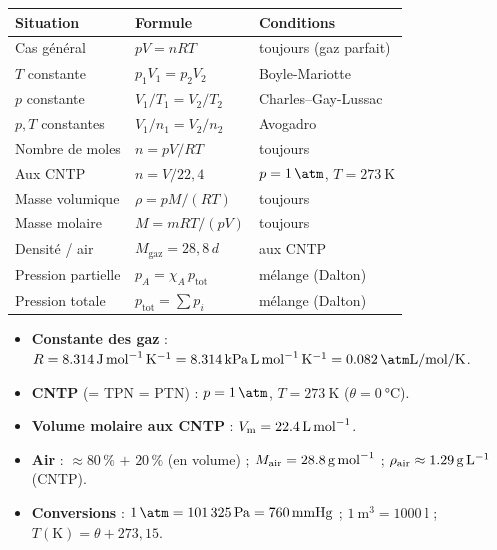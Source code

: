 \documentclass[11pt,a4paper]{article}
\newcommand{\Vm}{V_{\mathrm{m}}}
\begin{document}
\begin{tcolorbox}[boxbase,colback=formulacol!6,colframe=formulacol,
   title={\textsc{Mémo — les formules à connaître}}]
\begin{center}\renewcommand{\arraystretch}{1.5}
\begin{tabular}{l l l}
\toprule
\textbf{Situation} & \textbf{Formule} & \textbf{Conditions}\\
\midrule
Cas général                 & $pV=nRT$                       & toujours (gaz parfait)\\
$T$ constante               & $p_1V_1=p_2V_2$                & Boyle-Mariotte\\
$p$ constante               & $V_1/T_1=V_2/T_2$              & Charles--Gay-Lussac\\
$p,T$ constantes            & $V_1/n_1=V_2/n_2$             & Avogadro\\
Nombre de moles             & $n=pV/RT$                      & toujours\\
Aux CNTP                    & $n=V/22{,}4$                  & $p=\qty{1}{\atm}$, $T=\qty{273}{\kelvin}$\\
Masse volumique             & $\rho=pM/(RT)$                & toujours\\
Masse molaire               & $M=mRT/(pV)$                 & toujours\\
Densité / air               & $M_{\text{gaz}}=28{,}8\,d$    & aux CNTP\\
Pression partielle          & $p_A=\chi_A\,p_{\text{tot}}$  & mélange (Dalton)\\
Pression totale             & $p_{\text{tot}}=\sum p_i$     & mélange (Dalton)\\
\bottomrule
\end{tabular}
\end{center}
\end{tcolorbox}

\begin{tcolorbox}[boxbase,colback=primary!6,colframe=primary,
   title={\textsc{Mémo — valeurs et constantes de référence}}]
\begin{itemize}[leftmargin=1.6em,topsep=2pt,itemsep=2pt]
  \item \textbf{Constante des gaz} : $R=\qty{8{,}314}{\joule\per\mole\per\kelvin}=\qty{8{,}314}{\kilo\pascal\litre\per\mole\per\kelvin}=\qty{0{,}082}{\atm\litre\per\mole\per\kelvin}$.
  \item \textbf{CNTP} (= TPN = PTN) : $p=\qty{1}{\atm}$, $T=\qty{273}{\kelvin}$ ($\theta=\qty{0}{\degreeCelsius}$).
  \item \textbf{Volume molaire aux CNTP} : $\Vm=\qty{22{,}4}{\litre\per\mole}$.
  \item \textbf{Air} : $\approx 80\,\%$  $+$ $20\,\%$  (en volume) ; $M_{\text{air}}=\qty{28{,}8}{\gram\per\mole}$ ; $\rho_{\text{air}}\approx\qty{1{,}29}{\gram\per\litre}$ (CNTP).
  \item \textbf{Conversions} : $\qty{1}{\atm}=\qty{101325}{\pascal}=\qty{760}{\mmHg}$ ; $\qty{1}{\meter\cubed}=\qty{1000}{\litre}$ ; $T(\si{\kelvin})=\theta+273{,}15$.
\end{itemize}
\end{tcolorbox}
\end{document}
